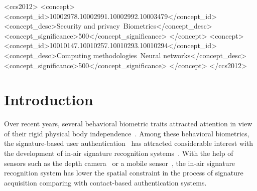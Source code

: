 \documentclass[sigconf]{acmart}
\begin{document}

\begin{CCSXML}
    <ccs2012>
    <concept>
    <concept_id>10002978.10002991.10002992.10003479</concept_id>
    <concept_desc>Security and privacy~Biometrics</concept_desc>
    <concept_significance>500</concept_significance>
    </concept>
    <concept>   
    <concept_id>10010147.10010257.10010293.10010294</concept_id>
    <concept_desc>Computing methodologies~Neural networks</concept_desc>
    <concept_significance>500</concept_significance>
    </concept>
    </ccs2012>
\end{CCSXML}
    



\maketitle

\section{Introduction}
Over recent years, several behavioral biometric traits attracted attention in view of their rigid physical body independence~\cite{bailador2011analysis}. Among these behavioral biometrics, the signature-based user authentication~\cite{sanmorino2012survey,galbally2015line} has attracted considerable interest with the development of in-air signature recognition systems~\cite{jeon2012system,sesa2012information,malik20183dairsig}.
With the help of sensors such as the depth camera~\cite{malik20183dairsig} or a mobile sensor~\cite{jeon2012system}, the in-air signature recognition system has lower the spatial constraint in the process of signature acquisition comparing with contact-based authentication systems. 
\end{document}
